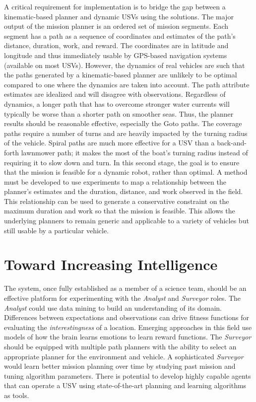 \documentclass{tamuccthesis}
\begin{document}
A critical requirement for implementation is to bridge the gap between a kinematic-based planner and dynamic USVs using the solutions. The major output of the mission planner is an ordered set of mission segments. Each segment has a path as a sequence of coordinates and estimates of the path's distance, duration, work, and reward. The coordinates are in latitude and longitude and thus immediately usable by GPS-based navigation systems (available on most USVs). However, the dynamics of real vehicles are such that the paths generated by a kinematic-based planner are unlikely to be optimal compared to one where the dynamics are taken into account. The path attribute estimates are idealized and will disagree with observations. Regardless of dynamics, a longer path that has to overcome stronger water currents will typically be worse than a shorter path on smoother seas. Thus, the planner results should be reasonable effective, especially the Goto paths. The coverage paths require a number of turns and are heavily impacted by the turning radius of the vehicle. Spiral paths are much more effective for a USV than a back-and-forth lawnmower path; it makes the most of the boat's turning radius instead of requiring it to slow down and turn. In this second stage, the goal is to ensure that the mission is feasible for a dynamic robot, rather than optimal. A method must be developed to use experiments to map a relationship between the planner's estimates and the duration, distance, and work observed in the field. This relationship can be used to generate a conservative constraint on the maximum duration and work so that the mission is feasible. This allows the underlying planners to remain generic and applicable to a variety of vehicles but still usable by a particular vehicle. 

\section{Toward Increasing Intelligence}

The system, once fully established as a member of a science team, should be an effective platform for experimenting with the \textit{Analyst} and \textit{\textit{Surveyor}} roles. The \textit{Analyst} could use data mining to build an understanding of its domain. Differences between expectations and observations can drive fitness functions for evaluating the \textit{interestingness} of a location. Emerging approaches in this field use models of how the brain learns emotions to learn reward functions. The \textit{Surveyor} should be equipped with multiple path planners with the ability to select an appropriate planner for the environment and vehicle. A sophisticated \textit{Surveyor} would learn better mission planning over time by studying past mission and tuning algorithm parameters. There is potential to develop highly capable agents that can operate a USV using state-of-the-art planning and learning algorithms as tools.
\end{document}
